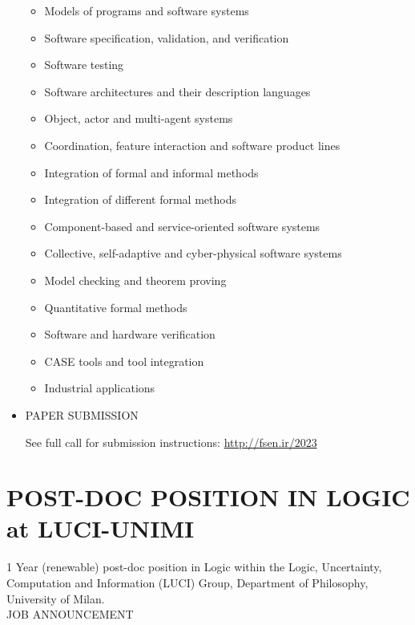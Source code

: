 \documentclass[prodmode,acmtecs]{acmsmall} %
\begin{document}
\begin{itemize}
\begin{itemize}\item  Models of programs and software systems
\item  Software specification, validation, and verification
\item  Software testing
\item  Software architectures and their description languages
\item  Object, actor and multi-agent systems
\item  Coordination, feature interaction and software product lines
\item  Integration of formal and informal methods
\item  Integration of different formal methods
\item  Component-based and service-oriented software systems
\item  Collective, self-adaptive and cyber-physical software systems
\item  Model checking and theorem proving
\item  Quantitative formal methods
\item  Software and hardware verification
\item  CASE tools and tool integration
\item  Industrial applications
\end{itemize} 
\item  PAPER SUBMISSION  
 
  See full call for submission instructions: \href{http://fsen.ir/2023}{http://fsen.ir/2023} 
 
\end{itemize}\section{POST-DOC POSITION IN LOGIC at LUCI-UNIMI}\label{POSTDOCPOSITIONINLOGICatLUCIUNIMI}  1 Year (renewable) post-doc position in Logic within the Logic, Uncertainty, Computation and Information (LUCI) Group, Department of Philosophy, University of Milan.\\ 
JOB ANNOUNCEMENT 
\end{document}
